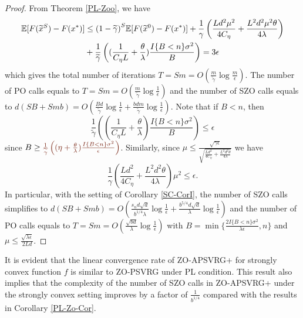 \documentclass{article}
\newcommand*{\E}{\mathbb{E}}
\theoremstyle{definition}
\theoremstyle{remark}
\begin{document}
\begin{proof}
From Theorem \ref{PL-Zoo}, we have
\begin{align}
\E[F(\widetilde{x}^S) - F(x^*)] & \leq {(1-\widetilde{\gamma})}^{S} \E[F(\widetilde{x}^0) - F(x^*)]+\frac{1}{{\gamma}}\left(\frac{Ld^2\mu^2}{4C_{\eta}}+\frac{ L^2d^2\mu^2\theta}{4\lambda}\right)\notag\\
&+ \frac{1}{\widetilde{\gamma}}\left((\frac{1}{C_{\eta} L}+\frac{\theta}{\lambda})\frac{I\{B < n\} \sigma ^2}{B}\right)= 3 \epsilon
\end{align}
which gives the total number of iterations  {\color{Brown} $T = Sm = O(\frac{m}{\widetilde{\gamma}}\log\frac{m}{\epsilon})$}. The number of PO calls equals to {\color{Brown} $T = Sm = O(\frac{m}{\widetilde{\gamma}}\log\frac{1}{\epsilon})$} and the number of SZO calls equals to {\color{Brown}$d(SB+Smb) = O(\frac{Bd}{\widetilde{\gamma}}\log\frac{1}{\epsilon}+\frac{bdm}{\widetilde{\gamma}}\log\frac{1}{\epsilon})$}. Note that if $B < n$, then 
\[
\frac{1}{\widetilde{\gamma}}\left((\frac{1}{C_{\eta} L}+\frac{\theta}{\lambda})\frac{I\{B < n\} \sigma ^2}{B}\right)\leq \epsilon
\]
since $B \geq {\color{Brown}\frac{1}{\widetilde{\gamma}}\left((\eta+\frac{\theta}{\lambda})\frac{I\{B < n\} \sigma ^2}{\epsilon}\right) }$.
Similarly, since {\color{Brown} $\mu \leq \frac{\sqrt{\gamma\epsilon}}{\sqrt{\frac{Ld^2}{4C_{\eta}}+\frac{ L^2d^2\theta}{4\lambda}}}$}
we have 
\[
\frac{1}{{\gamma}}\left(\frac{Ld^2}{4C_{\eta}}+\frac{ L^2d^2\theta}{4\lambda}\right)\mu^2 \leq \epsilon.
\]
In particular, with the setting of Corollary \ref{SC-CorI}, the number of SZO calls simplifies to 
{\color{blue}$d(S B+Smb) = O(\frac{s_nd\sqrt{d}}{b^{1/4} \lambda}\log\frac{1}{\epsilon}+\frac{b^{5/4} d\sqrt{d}}{\lambda}\log\frac{1}{\epsilon})$} and the number of PO calls equals to {\color{Blue} $T = Sm = O(\frac{\sqrt{bd}}{\lambda}\log\frac{1}{\epsilon})$} 
with $B = \min\{\frac{2I\{B < n\} \sigma ^2}{\lambda\epsilon}, n\}$ and $\mu \leq \frac{\sqrt{\lambda\epsilon}}{2Ld}$. 
\end{proof}
It is evident that the linear convergence rate of ZO-APSVRG+ for strongly convex function $f$ is similar to ZO-PSVRG under PL condition. {\color{DarkOrchid}
This result also implies that the complexity of the number of SZO calls in ZO-APSVRG+ under the strongly convex setting improves by a factor of $\frac{1}{b^{1/4}}$ compared with the results in Corollary \ref{PL-Zo-Cor}.
}
\end{document}
